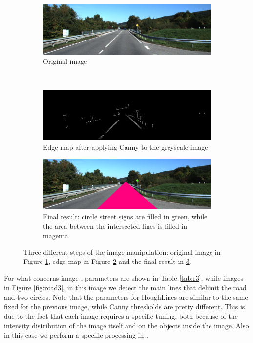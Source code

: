 \documentclass[twoside,onecolumn]{article}
\theoremstyle{definition}
\begin{document}
\begin{figure} \centering
\begin{subfigure}{0.8\textwidth}
  \includegraphics[width=\textwidth]{../images/road2.png}
\caption{Original image }\label{fig:r2fig}
\end{subfigure} \\
\begin{subfigure}{0.8\textwidth}
\includegraphics[width=\textwidth]{../results/edgeMap_road2.png}
\caption{Edge map after applying Canny to the greyscale image}\label{fig:r2edges}
\end{subfigure}
  \begin{subfigure}{0.8\textwidth}
\includegraphics[width=\textwidth]{../results/Circles_road2.png}
\caption{Final result: circle street signs are filled in green, while the area between the intersected lines is filled in magenta}\label{fig:r2circles}
\end{subfigure}\caption{Three different steps of the image manipulation: original image in Figure \ref{fig:r2fig}, edge map in Figure \ref{fig:r2edges} and the final result in \ref{fig:r2circles}. }\label{fig:road2}
\end{figure}

For what concerns image , parameters are shown in Table \ref{tab:r3}, while images in Figure \ref{fig:road3}, in this image we detect the main lines that delimit the road and two circles. Note that the parameters for HoughLines are similar to the same fixed for the previous image, while Canny thresholds are pretty different. This is due to the  fact that each image requires a specific tuning, both because of the intensity distribution of the image itself and on the objects inside the image. Also in this case we perform a specific processing in .
\end{document}

